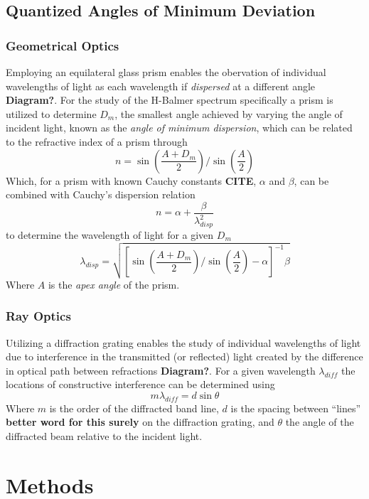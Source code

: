 \documentclass[10pt, twocolumn]{article}
\theoremstyle{definition}
\begin{document}
\subsection{Quantized Angles of Minimum Deviation}
\subsubsection{Geometrical Optics}
Employing an equilateral glass prism enables the obervation of individual wavelengths of light as each wavelength if \textit{dispersed} at a different angle \textbf{Diagram?}.
For the study of the H-Balmer spectrum specifically a prism is utilized to determine $D_m$, the smallest
angle achieved by varying the angle of incident light, known as the \textit{angle of minimum dispersion},
which can be related to the refractive index of a prism through
\begin{equation}
  n=\sin\left(\frac{A+D_m}{2}\right)/\sin\left(\frac{A}{2}\right)
\end{equation}
Which, for a prism with known Cauchy constants \textbf{CITE}, $\alpha$ and $\beta$, can be combined with Cauchy's dispersion relation
\begin{equation}\label{cauchy}
  n=\alpha+\frac{\beta}{\lambda_{disp}^2}
\end{equation}
to determine the wavelength of light for a given $D_m$
\begin{equation}
  \lambda_{disp}=\sqrt{\left[\sin\left(\frac{A+D_m}{2}\right)/\sin\left(\frac{A}{2}\right)-\alpha\right]^{-1}\beta}
\end{equation}
Where $A$ is the \textit{apex angle} of the prism.
\subsubsection{Ray Optics}
Utilizing a diffraction grating enables the study of individual wavelengths of light due to interference in the transmitted (or reflected) light
created by the difference in optical path between refractions \textbf{Diagram?}. For a given wavelength $\lambda_{diff}$ the locations of constructive interference can be
determined using
\begin{equation}
  m\lambda_{diff}=d\sin\theta
\end{equation}
Where $m$ is the order of the diffracted band line, $d$ is the spacing between ``lines'' \textbf{better word for this surely} on the diffraction grating, and $\theta$ the angle
of the diffracted beam relative to the incident light.
\section{Methods}
\end{document}

